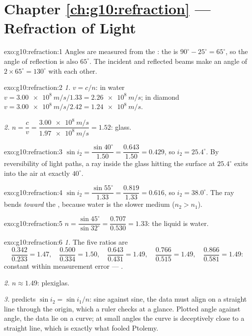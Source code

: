 \section*{Chapter \ref{ch:g10:refraction} --- Refraction of Light}

\begin{solution}{exo:g10:refraction:1}
Angles are measured from the : the  is
$90^\circ - 25^\circ = 65^\circ$, so the angle of reflection is also
$65^\circ$. The incident and reflected beams make an angle of
$2 \times 65^\circ = 130^\circ$ with each other.
\end{solution}

\begin{solution}{exo:g10:refraction:2}
\emph{1.} $v = c/n$: in water
$v = \qty{3.00e8}{m/s}/1.33 = \qty{2.26e8}{m/s}$; in diamond
$v = \qty{3.00e8}{m/s}/2.42 = \qty{1.24e8}{m/s}$.

\emph{2.} $n = \dfrac{c}{v} = \dfrac{\qty{3.00e8}{m/s}}
{\qty{1.97e8}{m/s}} = 1.52$: glass.
\end{solution}

\begin{solution}{exo:g10:refraction:3}
$\sin i_2 = \dfrac{\sin 40^\circ}{1.50} = \dfrac{0.643}{1.50} = 0.429$,
so $i_2 = 25.4^\circ$. By reversibility of light paths, a ray inside the
glass hitting the surface at $25.4^\circ$ exits into the air at exactly
$40^\circ$.
\end{solution}

\begin{solution}{exo:g10:refraction:4}
$\sin i_2 = \dfrac{\sin 55^\circ}{1.33} = \dfrac{0.819}{1.33} = 0.616$,
so $i_2 = 38.0^\circ$. The ray bends \emph{toward} the , because
water is the slower medium ($n_2 > n_1$).
\end{solution}

\begin{solution}{exo:g10:refraction:5}
$n = \dfrac{\sin 45^\circ}{\sin 32^\circ} = \dfrac{0.707}{0.530}
= 1.33$: the liquid is water.
\end{solution}

\begin{solution}{exo:g10:refraction:6}
\emph{1.} The five ratios are
\[
\frac{0.342}{0.233} = 1.47,\quad
\frac{0.500}{0.334} = 1.50,\quad
\frac{0.643}{0.431} = 1.49,\quad
\frac{0.766}{0.515} = 1.49,\quad
\frac{0.866}{0.581} = 1.49 :
\]
constant within measurement error --- .

\emph{2.} $n \approx 1.49$: plexiglas.

\emph{3.}  predicts $\sin i_2 = \sin i_1 / n$: sine against
sine, the data must align on a straight line through the origin, which a
ruler checks at a glance. Plotted angle against angle, the data lie on a
curve; at small angles the curve is deceptively close to a straight
line, which is exactly what fooled Ptolemy.
\end{solution}

